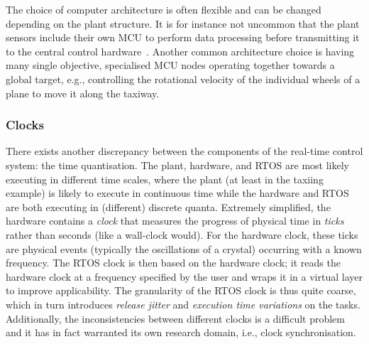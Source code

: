 The choice of computer architecture is often flexible and can be changed depending on the plant structure.
It is for instance not uncommon that the plant sensors include their own MCU to perform data processing before transmitting it to the central control hardware~\cite{Karray:2018}.
Another common architecture choice is having many single objective, specialised MCU nodes operating together towards a global target, e.g., controlling the rotational velocity of the individual wheels of a plane to move it along the taxiway.

\subsubsection{Clocks}%
%
There exists another discrepancy between the components of the real-time control system: the time quantisation.
The plant, hardware, and RTOS are most likely executing in different time scales, where the plant (at least in the taxiing example) is likely to execute in continuous time while the hardware and RTOS are both executing in (different) discrete quanta.
Extremely simplified, the hardware contains a \emph{clock} that measures the progress of physical time in \emph{ticks} rather than seconds (like a wall-clock would).
For the hardware clock, these ticks are physical events (typically the oscillations of a crystal) occurring with a known frequency.
The RTOS clock is then based on the hardware clock; it reads the hardware clock at a frequency specified by the user and wraps it in a virtual layer to improve applicability. 
The granularity of the RTOS clock is thus quite coarse, which in turn introduces \emph{release jitter} and \emph{execution time variations} on the tasks.
Additionally, the inconsistencies between different clocks is a difficult problem and it has in fact warranted its own research domain, i.e., clock synchronisation.

